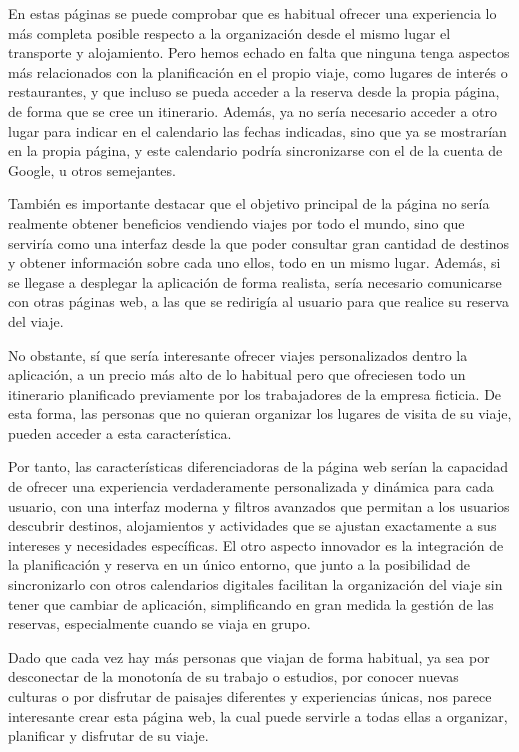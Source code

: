 \documentclass[11pt, a4paper]{book}
\begin{document}
	 En estas páginas se puede comprobar que es habitual ofrecer una experiencia lo más completa posible respecto a la organización desde el mismo lugar el transporte y alojamiento. Pero hemos echado en falta que ninguna tenga aspectos más relacionados con la planificación en el propio viaje, como lugares de interés o restaurantes, y que incluso se pueda acceder a la reserva desde la propia página, de forma que se cree un itinerario. Además, ya no sería necesario acceder a otro lugar para indicar en el calendario las fechas indicadas, sino que ya se mostrarían en la propia página, y este calendario podría sincronizarse con el de la cuenta de Google, u otros semejantes.
	 
	 También es importante destacar que el objetivo principal de la página no sería realmente obtener beneficios vendiendo viajes por todo el mundo, sino que serviría como una interfaz desde la que poder consultar gran cantidad de destinos y obtener información sobre cada uno ellos, todo en un mismo lugar. Además, si se llegase a desplegar la aplicación de forma realista, sería necesario comunicarse con otras páginas web, a las que se redirigía al usuario para que realice su reserva del viaje.
	 
	 No obstante, sí que sería interesante ofrecer viajes personalizados dentro la aplicación, a un precio más alto de lo habitual pero que ofreciesen todo un itinerario planificado previamente por los trabajadores de la empresa ficticia. De esta forma, las personas que no quieran organizar los lugares de visita de su viaje, pueden acceder a esta característica.
	 
	 Por tanto, las características diferenciadoras de la página web serían la capacidad de ofrecer una experiencia verdaderamente personalizada y dinámica para cada usuario, con una interfaz moderna y filtros avanzados que permitan a los usuarios descubrir destinos, alojamientos y actividades que se ajustan exactamente a sus intereses y necesidades específicas. El otro aspecto innovador es la integración de la planificación y reserva en un único entorno, que junto a la posibilidad de sincronizarlo con otros calendarios digitales facilitan la organización del viaje sin tener que cambiar de aplicación, simplificando en gran medida la gestión de las reservas, especialmente cuando se viaja en grupo. 
	 
	 Dado que cada vez hay más personas que viajan de forma habitual, ya sea por desconectar de la monotonía de su trabajo o estudios, por conocer nuevas culturas o por disfrutar de paisajes diferentes y experiencias únicas, nos parece interesante crear esta página web, la cual puede servirle a todas ellas a organizar, planificar y disfrutar de su viaje.
	
\end{document}

